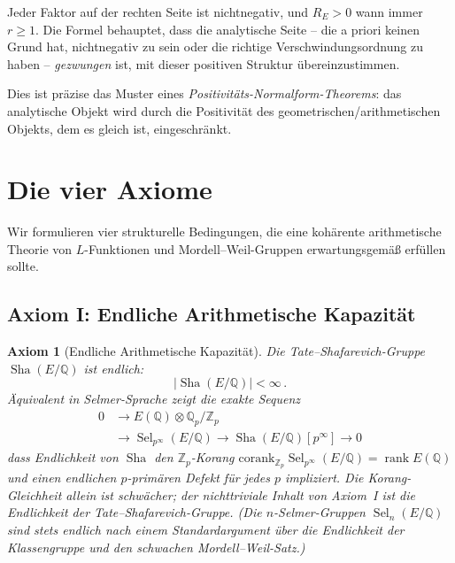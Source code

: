 \documentclass[aps,prd,twocolumn,superscriptaddress,nofootinbib,floatfix]{revtex4-2}
\newtheorem{axiom}[theorem]{Axiom}
\theoremstyle{definition}
\theoremstyle{remark}
\DeclareMathOperator{\rank}{rank}
\DeclareMathOperator{\Sel}{Sel}
\DeclareMathOperator{\Sha}{Sha}
\begin{document}
Jeder Faktor auf der rechten Seite ist nichtnegativ, und $R_E > 0$ wann immer $r \geq 1$. Die Formel behauptet, dass die analytische Seite -- die a priori keinen Grund hat, nichtnegativ zu sein oder die \glqq richtige\grqq{} Verschwindungsordnung zu haben -- \textit{gezwungen} ist, mit dieser positiven Struktur übereinzustimmen.

Dies ist präzise das Muster eines \textit{Positivitäts-Normalform-Theorems}: das analytische Objekt wird durch die Positivität des geometrischen/arithmetischen Objekts, dem es gleich ist, eingeschränkt.


\clearpage
\section{Die vier Axiome}
\label{sec:axioms}

Wir formulieren vier strukturelle Bedingungen, die eine kohärente arithmetische Theorie von $L$-Funktionen und Mordell--Weil-Gruppen erwartungsgemäß erfüllen sollte.

\subsection{Axiom I: Endliche Arithmetische Kapazität}

\begin{axiom}[Endliche Arithmetische Kapazität]
\label{ax:finite}
Die Tate--Shafarevich-Gruppe $\Sha(E/\mathbb{Q})$ ist endlich:
\begin{equation}
|\Sha(E/\mathbb{Q})| < \infty\,.
\end{equation}
Äquivalent in Selmer-Sprache zeigt die exakte Sequenz
\[
\begin{aligned}
0 &\longrightarrow E(\mathbb{Q})\otimes \mathbb{Q}_p/\mathbb{Z}_p \\
  &\longrightarrow \Sel_{p^\infty}(E/\mathbb{Q})
  \longrightarrow \Sha(E/\mathbb{Q})[p^\infty]
  \longrightarrow 0
\end{aligned}
\]
dass Endlichkeit von $\Sha$ den $\mathbb{Z}_p$-Korang
$\mathrm{corank}_{\mathbb{Z}_p}\Sel_{p^\infty}(E/\mathbb{Q})=\rank E(\mathbb{Q})$
und einen endlichen $p$-primären Defekt für jedes $p$ impliziert. Die
Korang-Gleichheit allein ist schwächer; der nichttriviale Inhalt von
Axiom~I ist die Endlichkeit der Tate--Shafarevich-Gruppe. (Die
$n$-Selmer-Gruppen $\Sel_n(E/\mathbb{Q})$ sind stets endlich nach einem
Standardargument über die Endlichkeit der Klassengruppe und den schwachen
Mordell--Weil-Satz.)
\end{axiom}
\end{document}
